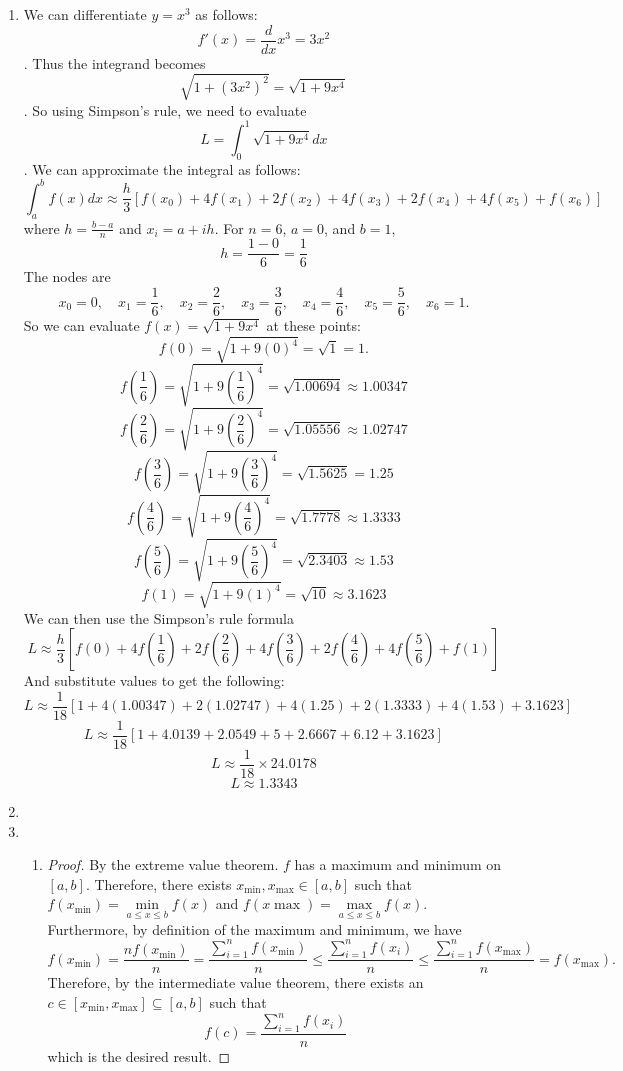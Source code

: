 \documentclass[12pt]{article}
\begin{document}
\begin{enumerate}[leftmargin=2em]
    \item We can differentiate $y=x^{3}$ as follows:
    \[ f'(x) = \frac{d}{dx}x^{3} = 3x^{2}\].
    Thus the integrand becomes 
    \[\sqrt{1+(3x^{2})^{2}} = \sqrt{1+9x^{4}}\].
    So using Simpson's rule, we need to evaluate 
    \[L = \int_{0}^{1}\sqrt{1+9x^{4}}dx\].
    We can approximate the integral as follows:
    \[\int_{a}^{b}f(x)dx \approx \frac{h}{3}[f(x_0)+4f(x_1)+2f(x_2)+4f(x_3)+2f(x_4)+4f(x_5)+f(x_6)]\]
    where $h = \frac{b-a}{n}$ and $x_i = a+ih$.
    For $n=6$, $a=0$, and $b=1$,
    \[h=\frac{1-0}{6} = \frac{1}{6}\]
    The nodes are
    \[x_0 = 0, \quad x_1 = \frac{1}{6}, \quad x_2 = \frac{2}{6}, \quad x_3 = \frac{3}{6}, \quad x_4 = \frac{4}{6}, \quad x_5 = \frac{5}{6}, \quad x_6 = 1.\]
    So we can evaluate $f(x) = \sqrt{1+9x^4}$ at these points:
    \[f(0) = \sqrt{1 + 9(0)^4} = \sqrt{1} = 1.\]
    \[f\left(\frac{1}{6}\right) = \sqrt{1 + 9\left(\frac{1}{6}\right)^4} = \sqrt{1.00694} \approx 1.00347\]
    \[f\left(\frac{2}{6}\right) = \sqrt{1 + 9\left(\frac{2}{6}\right)^4} = \sqrt{1.05556} \approx 1.02747\]
    \[f\left(\frac{3}{6}\right) = \sqrt{1 + 9\left(\frac{3}{6}\right)^4} = \sqrt{1.5625} = 1.25\]
    \[f\left(\frac{4}{6}\right) = \sqrt{1 + 9\left(\frac{4}{6}\right)^4} = \sqrt{1.7778} \approx 1.3333\]
    \[f\left(\frac{5}{6}\right) = \sqrt{1 + 9\left(\frac{5}{6}\right)^4} = \sqrt{2.3403} \approx 1.53\]
    \[f(1) = \sqrt{1 + 9(1)^4} = \sqrt{10} \approx 3.1623\]
    We can then use the Simpson's rule formula
    \[L \approx \frac{h}{3} \left[ f(0) + 4f\left(\frac{1}{6}\right) + 2f\left(\frac{2}{6}\right) + 4f\left(\frac{3}{6}\right) + 2f\left(\frac{4}{6}\right) + 4f\left(\frac{5}{6}\right) + f(1) \right]\]
    And substitute values to get the following:
    \[L \approx \frac{1}{18} \left[ 1 + 4(1.00347) + 2(1.02747) + 4(1.25) + 2(1.3333) + 4(1.53) + 3.1623 \right]\]
    \[L \approx \frac{1}{18} \left[ 1 + 4.0139 + 2.0549 + 5 + 2.6667 + 6.12 + 3.1623 \right]\]
    \[L \approx \frac{1}{18} \times 24.0178\]
    \[L \approx 1.3343\]


    \item 

    \item
    \begin{enumerate}[leftmargin=!]
        \item 
        \begin{proof}
            By the extreme value theorem. $f$ has a maximum and minimum on $[a,b]$. Therefore, there exists $x_{\min},x_{\max}\in [a,b]$ such that
            $f(x_{\min})= \min\limits_{a\leq x\leq b} f(x)$ and $f(x\max)= \max\limits_{a\leq x\leq b} f(x)$. Furthermore, by definition of the maximum and minimum, we have
            \[f(x_{\min}) = \frac{nf(x_{\min})}{n} = \frac{\sum\limits_{i=1}^{n} f(x_{\min})}{n} \leq \frac{\sum\limits_{i=1}^{n} f(x_{i})}{n} \leq \frac{\sum\limits_{i=1}^{n} f(x_{\max})}{n}= f(x_{\max}).\]
            Therefore, by the intermediate value theorem, there exists an $c \in [x_{\min},x_{\max}]\subseteq [a,b]$ such that 
            \[f(c)= \frac{\sum\limits_{i=1}^{n} f(x_{i})}{n}\]
            which is the desired result.
        \end{proof}


\end{enumerate}
\end{enumerate}
\end{document}
